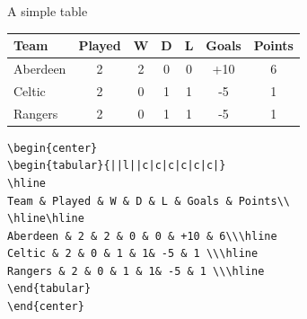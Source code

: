 \documentclass{beamer}
\def\mynormal{\vspace*{-0.5cm}}
\begin{document}
\begin{frame}[fragile]{A simple table}
\mynormal
\bigskip
\begin{center}
\begin{tabular}{||l||c|c|c|c|c|c|}
\hline
Team & Played & W & D & L & Goals & Points\\\hline\hline
Aberdeen & 2 & 2 & 0 & 0 & +10 & 6\\\hline
Celtic & 2 & 0 & 1 & 1& -5 & 1 \\\hline
Rangers & 2 & 0 & 1 & 1& -5 & 1 \\\hline
\end{tabular}
\end{center}
\begin{lstlisting}
\begin{center}
\begin{tabular}{||l||c|c|c|c|c|c|}
\hline
Team & Played & W & D & L & Goals & Points\\
\hline\hline
Aberdeen & 2 & 2 & 0 & 0 & +10 & 6\\\hline
Celtic & 2 & 0 & 1 & 1& -5 & 1 \\\hline
Rangers & 2 & 0 & 1 & 1& -5 & 1 \\\hline
\end{tabular}
\end{center}
\end{lstlisting}
\begin{flushright}
\end{flushright}
\end{frame}
\end{document}
